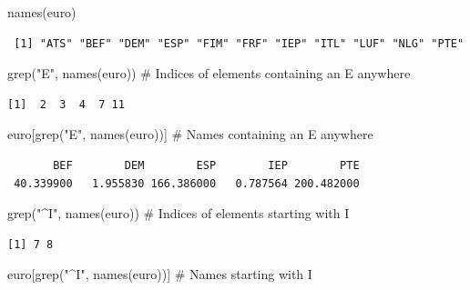 \documentclass[
  letterpaper,
  DIV=11,
  numbers=noendperiod]{scrreprt}
\newenvironment{Shaded}{\begin{snugshade}}{\end{snugshade}}
\newcommand{\CommentTok}[1]{\textcolor[rgb]{0.37,0.37,0.37}{#1}}
\newcommand{\FunctionTok}[1]{\textcolor[rgb]{0.28,0.35,0.67}{#1}}
\newcommand{\NormalTok}[1]{\textcolor[rgb]{0.00,0.23,0.31}{#1}}
\newcommand{\StringTok}[1]{\textcolor[rgb]{0.13,0.47,0.30}{#1}}
\begin{document}
\begin{Shaded}
\begin{Highlighting}[]
\FunctionTok{names}\NormalTok{(euro)}
\end{Highlighting}
\end{Shaded}

\begin{verbatim}
 [1] "ATS" "BEF" "DEM" "ESP" "FIM" "FRF" "IEP" "ITL" "LUF" "NLG" "PTE"
\end{verbatim}

\begin{Shaded}
\begin{Highlighting}[]
\FunctionTok{grep}\NormalTok{(}\StringTok{"E"}\NormalTok{, }\FunctionTok{names}\NormalTok{(euro)) }\CommentTok{\# Indices of elements containing an E anywhere}
\end{Highlighting}
\end{Shaded}

\begin{verbatim}
[1]  2  3  4  7 11
\end{verbatim}

\begin{Shaded}
\begin{Highlighting}[]
\NormalTok{euro[}\FunctionTok{grep}\NormalTok{(}\StringTok{"E"}\NormalTok{, }\FunctionTok{names}\NormalTok{(euro))] }\CommentTok{\# Names containing an E anywhere}
\end{Highlighting}
\end{Shaded}

\begin{verbatim}
       BEF        DEM        ESP        IEP        PTE 
 40.339900   1.955830 166.386000   0.787564 200.482000 
\end{verbatim}

\begin{Shaded}
\begin{Highlighting}[]
\FunctionTok{grep}\NormalTok{(}\StringTok{"\^{}I"}\NormalTok{, }\FunctionTok{names}\NormalTok{(euro)) }\CommentTok{\# Indices of elements starting with I}
\end{Highlighting}
\end{Shaded}

\begin{verbatim}
[1] 7 8
\end{verbatim}

\begin{Shaded}
\begin{Highlighting}[]
\NormalTok{euro[}\FunctionTok{grep}\NormalTok{(}\StringTok{"\^{}I"}\NormalTok{, }\FunctionTok{names}\NormalTok{(euro))] }\CommentTok{\# Names starting with I}
\end{Highlighting}
\end{Shaded}
\end{document}

